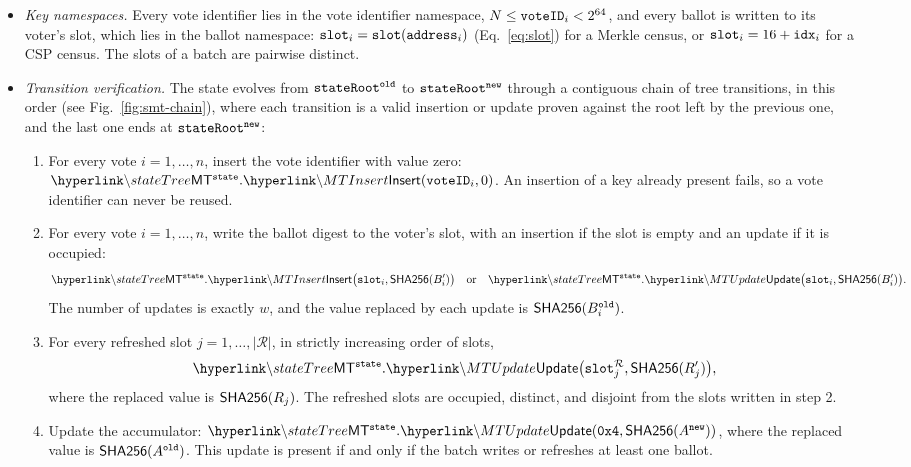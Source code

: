 \begin{itemize}
			\[\hlget{\stateTree}.\hlget{\MTVerify}(v_\kappa, \kappa, \merkleInclusionPf^{\kappa}, \stateroot^\old) = \true, \qquad \kappa \in \{\texttt{0x0}, \texttt{0x2}, \texttt{0x3}, \texttt{0x6}, \texttt{0x7}\}.\]
		The number of active fields $n_f$ is read from the packed \ballotmode and must lie in $[1, 16]$.
		\item \emph{Key namespaces.} Every vote identifier lies in the vote identifier namespace, $N \le \texttt{voteID}_i < 2^{64}$, and every ballot is written to its voter's slot, which lies in the ballot namespace: $\texttt{slot}_i = \texttt{slot}(\texttt{address}_i)$ (Eq.~\eqref{eq:slot}) for a Merkle census, or $\texttt{slot}_i = 16 + \texttt{idx}_i$ for a \ac{CSP} census. The slots of a batch are pairwise distinct.
		\item \emph{Transition verification.} The state evolves from $\texttt{stateRoot}^\texttt{old}$ to $\texttt{stateRoot}^\texttt{new}$ through a contiguous chain of tree transitions, in this order (see Fig.~\ref{fig:smt-chain}), where each transition is a valid insertion or update proven against the root left by the previous one, and the last one ends at $\texttt{stateRoot}^\texttt{new}$:
		\begin{enumerate}
			\item For every vote $i = 1,\dots,n$, insert the vote identifier with value zero: $\hlget{\stateTree}.\hlget{\MTInsert}(\voteid_i, 0)$. An insertion of a key already present fails, so a vote identifier can never be reused.
			\item For every vote $i = 1,\dots,n$, write the ballot digest to the voter's slot, with an insertion if the slot is empty and an update if it is occupied:
			\[\hlget{\stateTree}.\hlget{\MTInsert}\bigl(\slot_i, \Sha(B'_i)\bigr) \quad \text{or} \quad \hlget{\stateTree}.\hlget{\MTUpdate}\bigl(\slot_i, \Sha(B'_i)\bigr).\] The number of updates is exactly $w$, and the value replaced by each update is ${\sf{SHA256}}(B^\texttt{old}_i)$.
			\item For every refreshed slot $j = 1,\dots,|\mathcal{R}|$, in strictly increasing order of slots,
			\[\hlget{\stateTree}.\hlget{\MTUpdate}\bigl(\slot^{\mathcal{R}}_j, \Sha(R'_j)\bigr),\]
			where the replaced value is ${\sf{SHA256}}(R_j)$. The refreshed slots are occupied, distinct, and disjoint from the slots written in step 2.
			\item Update the accumulator: $\hlget{\stateTree}.\hlget{\MTUpdate}(\texttt{0x4}, \Sha(A^\new))$, where the replaced value is ${\sf{SHA256}}(A^\texttt{old})$. This update is present if and only if the batch writes or refreshes at least one ballot.
		\end{enumerate}

\end{itemize}
